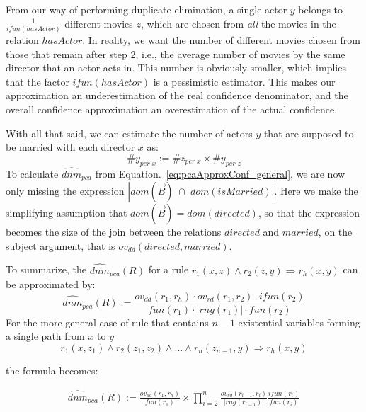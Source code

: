 From our way of performing duplicate elimination, a single actor $y$ belongs to $\frac{1}{ifun(hasActor)}$ different movies $z$, 
which are chosen from \emph{all} the movies in the relation $hasActor$.
In reality, we want the number of different movies chosen from those that remain after step 2, %
i.e., the average number of movies by the same director that an actor acts in. This number is obviously smaller, which
implies that the factor $ifun(hasActor)$ is a pessimistic estimator. This makes 
our approximation an underestimation of the real confidence denominator, 
and the overall confidence approximation an overestimation of the actual confidence.

With all that said, we can estimate the number of actors $y$ that are supposed to be married with each director $x$ as:
$$
 \#y_{per\;x} :=  \#z_{per \; x} \times \#y_{ per \; z}
$$
\noindent To calculate $\widehat{dnm}_{pca}$ from Equation.~\ref{eq:pcaApproxConf_general}, we are now only missing 
the expression $|dom(\vec{B})\;\cap\;dom(isMarried)|$. 
Here we make the simplifying assumption that $dom(\vec{B}) = dom(directed)$, so that the expression
becomes the size of the join between the relations $directed$ and $married$, on the subject argument, 
that is $ov_{dd}(directed,married)$.

To summarize, the $ \widehat{dnm}_{pca}(R)$ for a rule $r_1(x,z)\wedge r_2(z,y) \Rightarrow r_h(x,y)$ can be approximated by:
\[
  \widehat{dnm}_{pca}(R) := \frac{ov_{dd}(r_1,r_h) \cdot ov_{rd}(r_1,r_2) \cdot ifun(r_2)  }{fun(r_1) \cdot |rng(r_1)| \cdot fun(r_2)}
\]
For the more general case of rule that contains $n-1$ existential variables forming a single path from $x$ to $y$
$$
  r_1(x,z_1) \wedge r_2(z_1,z_2) \wedge ... \wedge r_n(z_{n-1},y) \Rightarrow r_h(x,y)
$$

\noindent the formula becomes:

\begin{eqnarray*}
  \widehat{dnm}_{pca}(R) := \frac{ov_{dd}(r_1,r_h)}{fun(r_1)}  \times 
  \prod_{i=2}^{n}\frac{ov_{rd}(r_{i-1},r_i) }{|rng(r_{i-1})|}\frac{ifun(r_i)}{fun(r_i)}
\end{eqnarray*}





